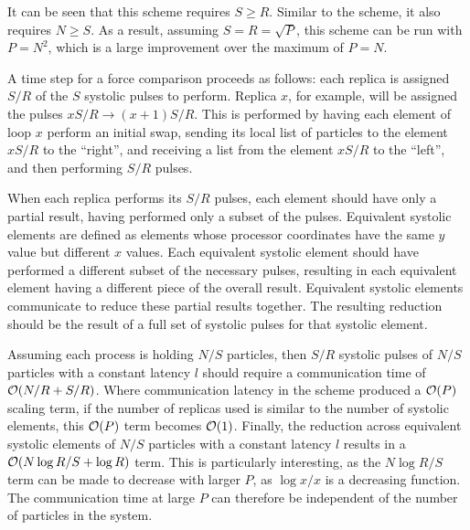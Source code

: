 It can be seen that this scheme requires $S \ge{} R$.
%
Similar to the \systolicloop{} scheme, it also requires $N \ge{} S$.
%
As a result, assuming $S = R = \sqrt{P}$, this scheme can be run
with $P = N^2$, which is a large improvement over the \systolicloop{}
maximum of $P = N$.


A time step for a force comparison proceeds as follows:
each replica is assigned $S/R$ of the $S$ systolic pulses to
perform.
%
Replica $x$, for example, will be assigned the pulses
$xS/R \rightarrow{} (x+1)S/R$.
%
This is performed by having each element of loop $x$ perform an initial
swap, sending its local list of particles to
the element $xS/R$ to the ``right'',
and receiving a list from the element $xS/R$ to the ``left'',
and then performing $S/R$ pulses.

When each replica performs its $S/R$ pulses, each element
should have only a partial result, having performed only a subset
of the pulses.
%
Equivalent systolic elements are defined as elements whose
processor coordinates have the same $y$ value but different $x$ values.
%
Each equivalent systolic element should have performed a different
subset of the necessary pulses, resulting in each equivalent element
having a different piece of the overall result.
%
Equivalent systolic elements communicate to
reduce these partial results together.
%
The resulting reduction should be the result of a full set of systolic pulses
for that systolic element.


Assuming each process is holding $N/S$ particles, then $S/R$
systolic pulses of $N/S$ particles with a constant latency $l$
should require a communication time of $\mathcal{O}{\left({ N/R + S/R }\right)}$.
%
Where communication latency in the \systolicloop{} scheme produced
a $\mathcal{O}{\left({ P }\right)}$ scaling term, if the number of replicas used is
similar to the number of systolic elements, this $\mathcal{O}{\left({ P }\right)}$ term
becomes $\mathcal{O}{\left({ 1 }\right)}$.
%
Finally, the reduction across equivalent systolic elements of
$N/S$ particles with a constant latency $l$ results in a
$\mathcal{O}{\left({ N\log{R}/S + \log{R} }\right)}$ term.
%
This is particularly interesting, as the $N\log{R}/S$ term can
be made to decrease with larger $P$, as $\log{x}/x$ is a decreasing
function.
%
The communication time at large $P$ can therefore be independent
of the number of particles in the system.
